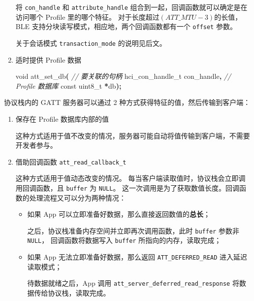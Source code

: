 \documentclass[
  12pt,
]{book}
\newenvironment{Shaded}{\begin{snugshade}}{\end{snugshade}}
\newcommand{\CommentTok}[1]{\textcolor[rgb]{0.56,0.35,0.01}{\textit{#1}}}
\newcommand{\DataTypeTok}[1]{\textcolor[rgb]{0.13,0.29,0.53}{#1}}
\newcommand{\NormalTok}[1]{#1}
\newcommand{\OperatorTok}[1]{\textcolor[rgb]{0.81,0.36,0.00}{\textbf{#1}}}
\begin{document}
\begin{enumerate}
  将 \texttt{con\_handle} 和 \texttt{attribute\_handle} 组合到一起，回调函数就可以确定是在访问哪个 Profile 里的哪个特征。
  对于长度超过\((ATT\_MTU - 3)\)的长值，BLE 支持分块读写模式，相应地，两个回调函数都有一个 \texttt{offset} 参数。

  关于会话模式 \texttt{transaction\_mode} 的说明见后文。
\item
  适时提供 Profile 数据

\begin{Shaded}
\begin{Highlighting}[]
\DataTypeTok{void}\NormalTok{ att\_set\_db}\OperatorTok{(}
  \CommentTok{// 要关联的句柄}
\NormalTok{  hci\_con\_handle\_t con\_handle}\OperatorTok{,}
  \CommentTok{// Profile 数据库}
  \DataTypeTok{const} \DataTypeTok{uint8\_t} \OperatorTok{*}\NormalTok{db}\OperatorTok{);}
\end{Highlighting}
\end{Shaded}
\end{enumerate}

协议栈内的 GATT 服务器可以通过 2 种方式获得特征的值，然后传输到客户端：

\begin{enumerate}
\def\labelenumi{\arabic{enumi}.}
\item
  保存在 Profile 数据库内部的值

  这种方式适用于值不改变的情况，服务器可能自动将值传输到客户端，不需要开发者参与。
\item
  借助回调函数 \texttt{att\_read\_callback\_t}

  这种方式适用于值动态改变的情况。
  每当客户端读取值时，协议栈会立即调用回调函数，且 \texttt{buffer} 为 \texttt{NULL}。
  这一次调用是为了获取数值长度。回调函数的处理流程又可以分为两种情况：

  \begin{itemize}
  \item
    如果 App 可以立即准备好数据，那么直接返回数值的\textbf{总长}；

    之后，协议栈准备内存空间并立即再次调用函数，此时 \texttt{buffer} 参数非 \texttt{NULL}，
    回调函数将数据写入 \texttt{buffer} 所指向的内存，读取完成；
  \item
    如果 App 无法立即准备好数据，那么返回 \texttt{ATT\_DEFERRED\_READ} 进入延迟读取模式；

    待数据就绪之后，App 调用 \texttt{att\_server\_deferred\_read\_response} 将数据传给协议栈，读取完成。
  \end{itemize}
\end{enumerate}
\end{document}
